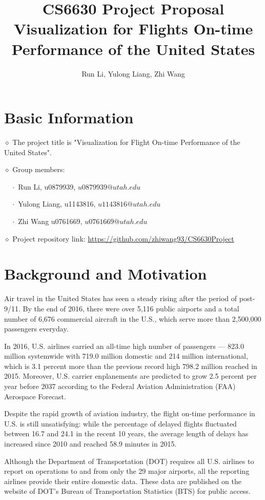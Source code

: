 \documentclass[12pt]{article}
\title{CS6630 Project Proposal\\
       Visualization for Flights On-time Performance of the United States}
\author{Run Li, Yulong Liang, Zhi Wang}
\begin{document}
\maketitle

\section{Basic Information}
    $\diamond$ The project title is "Visualization for Flight On-time Performance of the United States".

    $\diamond$ Group members:

    $\quad\cdot$ Run Li, u0879939, $u0879939@utah.edu$

    $\quad\cdot$ Yulong Liang, u1143816, $u1143816@utah.edu$

    $\quad\cdot$ Zhi Wang u0761669, $u0761669@utah.edu$

    $\diamond$ Project repository link: \url{https://github.com/zhiwang93/CS6630Project}

\section{Background and Motivation}

Air travel in the United States has seen a steady rising after the period of post-9/11. By the end of 2016, there were over 5,116 public airports and a total number of 6,676 commercial aircraft in the U.S., which serve more than 2,500,000 passengers everyday.\cite{byTheNumbers}

In 2016, U.S. airlines carried an all-time high number of passengers --- 823.0 million systemwide with 719.0 million domestic and 214 million international, which is 3.1 percent more than the previous record high 798.2 million reached in 2015.\cite{2016data} Moreover, U.S. carrier enplanements are predicted to grow 2.5 percent per year before 2037 according to the Federal Aviation Administration (FAA) Aerospace Forecast.\cite{FAA_A_F}

Despite the rapid growth of aviation industry, the flight on-time performance in U.S. is still unsatisfying: while the percentage of delayed flights fluctuated between 16.7 and 24.1 in the recent 10 years, the average length of delays has increased since 2010 and reached 58.9 minutes in 2015.\cite{PTFF2016}

Although the Department of Transportation (DOT) requires all U.S. airlines to report on operations to and from only the 29 major airports, all the reporting airlines provide their entire domestic data.\cite{airconsumer} These data are published on the website of DOT's Bureau of Transportation Statistics (BTS) for public access.
\end{document}
